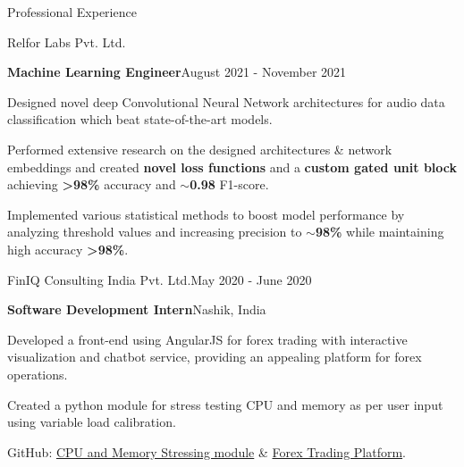 \documentclass{resume} %
\begin{document}
\begin{rSection}{Professional Experience}
\begin{rSubsection}{Relfor Labs Pvt. Ltd.}
\begin{rSubsubsection}{\textbf{Machine Learning Engineer}}{August 2021 - November 2021}{}
    \item Designed novel deep Convolutional Neural Network architectures for audio data classification which beat state-of-the-art models.
    \item Performed extensive research on the designed architectures \& network embeddings and created \textbf{novel loss functions} and a \textbf{custom gated unit block} achieving \textbf{>98\%} accuracy and \textbf{$\sim$0.98} F1-score.
    \item Implemented various statistical methods to boost model performance by analyzing threshold values and increasing precision to \textbf{$\sim$98\%} while maintaining high accuracy \textbf{>98\%}.
\end{rSubsubsection}
\vspace{-0.4em}
\end{rSubsection}
\vspace{-0.4em}
\hdashrule[1pt]{19cm}{0.5pt}{1mm 1mm}
\begin{rSubsection}{FinIQ Consulting India Pvt. Ltd.}{May 2020 - June 2020}{}{}
\begin{rSubsubsection}{\textbf{Software Development Intern}}{Nashik, India}{}
\item Developed a front-end using AngularJS for forex trading with interactive visualization and chatbot service, providing an appealing platform for forex operations.
\item Created a python module for stress testing CPU and memory as per user input using variable load calibration.
\item GitHub: \href{https://github.com/obi-wan-shinobi/Stress-test}{CPU and Memory Stressing module} \& \href{https://github.com/obi-wan-shinobi/Forex-Trading}{Forex Trading Platform}.
\end{rSubsubsection}
\end{rSubsection}


\end{rSection}
\smallskip

\end{document}
